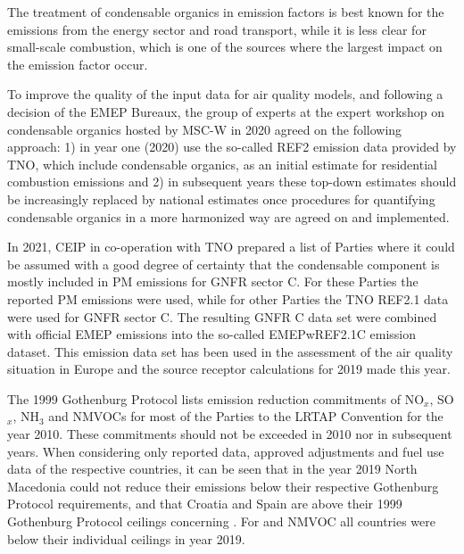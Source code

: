 The treatment of condensable organics in emission factors is best known for the emissions from the energy sector and road transport, while it is less clear for small-scale combustion, which is one of the sources where the largest impact on the emission factor occur.

To improve the quality of the input data for air quality models, and following a decision of the EMEP Bureaux, the group of experts at the expert workshop on condensable organics hosted by MSC-W in 2020 agreed on the following approach: 1) in year one (2020) use the so-called REF2 emission data provided by TNO, which include condensable organics, as an initial estimate for residential combustion emissions and 2) in subsequent years these top-down estimates should be increasingly replaced by national estimates once procedures for quantifying condensable organics in a more harmonized way are agreed on and implemented. 

In 2021, CEIP in co-operation with TNO prepared a list of Parties where it could be assumed with a good degree of certainty that the condensable component is mostly included in PM emissions for GNFR sector C. For these Parties the reported PM emissions were used, while for other Parties the TNO REF2.1 data were used for GNFR sector C. The resulting GNFR C data set were combined with official EMEP emissions into the so-called EMEPwREF2.1C emission dataset. This emission data set has been used in the assessment of the air quality situation in Europe and the source receptor calculations for 2019 made this year. 

The 1999 Gothenburg Protocol lists emission reduction commitments of NO$_x$, SO$_x$, NH$_3$ and NMVOCs for most of the Parties to the LRTAP Convention for the year 2010. These commitments should not be exceeded in 2010 nor in subsequent years. When considering only reported data, approved adjustments and fuel use data of the respective countries, it can be seen that in the year 2019 North Macedonia could not reduce their \sox emissions below their respective Gothenburg Protocol requirements, and that Croatia and Spain are above their 1999 Gothenburg Protocol ceilings concerning \nhiii. For \nox and NMVOC all countries were below their individual ceilings in year 2019.

